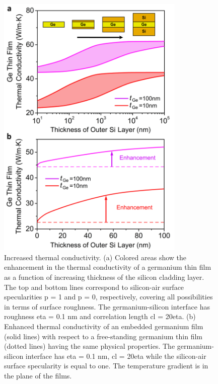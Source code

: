 \begin{figure}[hbtp]
  \centering \includegraphics[width=0.80\textwidth]{figures/ch5/Fig1-enh.jpg}
  \caption{Increased thermal conductivity. (a) Colored areas show the enhancement in the thermal conductivity of a germanium thin film as a function of increasing thickness of the silicon cladding layer. The top and bottom lines correspond to silicon-air surface specularities \gls{p} = 1 and \gls{p} = 0, respectively, covering all possibilities in terms of surface roughness. The germanium-silicon interface has roughness \gls{eta} = 0.1 nm and correlation length \gls{cl} = 20\gls{eta}. (b) Enhanced thermal conductivity of an embedded germanium film (solid lines) with respect to a free-standing germanium thin film (dotted lines) having the same physical properties. The germanium-silicon interface has \gls{eta} = 0.1 nm, \gls{cl} = 20\gls{eta} while the silicon-air surface specularity is equal to one. The temperature gradient is in the plane of the films.}
    \label{fig:ch5-enh1}
\end{figure}
